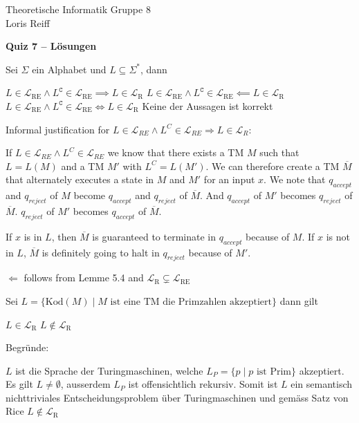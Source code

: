 \documentclass[a4paper,ngerman,12pt]{exam}
\renewcommand\L{\mathcal{L}}
\begin{document}
\noindent Theoretische Informatik \hfill Gruppe 8 \\
\mbox{}\hfill Loris Reiff
\begin{center}
  \bfseries\Large
  Quiz 7\ifprintanswers
  -- Lösungen
\fi
\end{center}

\begin{questions}
  \question
  Sei $\Sigma$ ein Alphabet und $L \subseteq \Sigma^*$, dann
  \begin{checkboxes}
    \CorrectChoice $L \in \L_{\mathrm{RE}} \wedge
      L^\texttt{C} \in \L_{\mathrm{RE}} \implies L \in \L_{\mathrm{R}}$
    \CorrectChoice $L \in \L_{\mathrm{RE}} \wedge
      L^\texttt{C} \in \L_{\mathrm{RE}} \impliedby L \in \L_{\mathrm{R}}$
    \CorrectChoice $L \in \L_{\mathrm{RE}} \wedge
      L^\texttt{C} \in \L_{\mathrm{RE}} \iff L \in \L_{\mathrm{R}}$
    \choice Keine der Aussagen ist korrekt
  \end{checkboxes}
\begin{solution}
Informal justification for
    $L \in \L_{RE} \wedge L^C \in \L_{RE} \Rightarrow L \in \L_R$:

    If $L \in \L_{RE} \wedge L^C \in \L_{RE}$ we know that there
    exists a TM $M$ such that $L = L(M)$ and a TM $M'$ with $L^C = L(M')$.
    We can therefore create a TM $\overline{M}$ that alternately executes a state
    in $M$ and $M'$ for an input $x$.
    We note that $q_{accept}$ and $q_{reject}$ of $M$ become
    $q_{accept}$ and $q_{reject}$ of $\overline{M}$.
    And $q_{accept}$ of $M'$ becomes $q_{reject}$ of $\overline{M}$.
    $q_{reject}$ of $M'$ becomes $q_{accept}$ of $\overline{M}$.

    If $x$ is in $L$, then $\overline{M}$ is guaranteed to terminate in
    $q_{accept}$ because of $M$. If $x$ is not in $L$, $\overline{M}$ is
    definitely going to halt in $q_{reject}$ because of $M'$.

    $\Leftarrow$ follows from Lemme 5.4 and $\L_{\mathrm{R}} \subsetneq \L_{\mathrm{RE}}$
\end{solution}

\question Sei
    $L = \{\text{Kod}(M) \mid M \text{ ist eine TM die Primzahlen akzeptiert}\}$
  dann gilt

  \begin{checkboxes}
    \choice $L \in \L_\mathrm{R}$
    \CorrectChoice $L \not\in \L_\mathrm{R}$
  \end{checkboxes}

  Begründe:
\begin{solutionorbox}[10em]
  $L$ ist die Sprache der Turingmaschinen, welche $L_P = \{p \mid p \text{ ist Prim}\}$
  akzeptiert. Es gilt $L \neq \emptyset$, ausserdem $L_P$ ist offensichtlich rekursiv.
  Somit ist $L$ ein semantisch nichttriviales Entscheidungsproblem über Turingmaschinen und
  gemäss Satz von Rice $L \not\in \L_\mathrm{R}$
\end{solutionorbox}


\end{questions}
\end{document}
